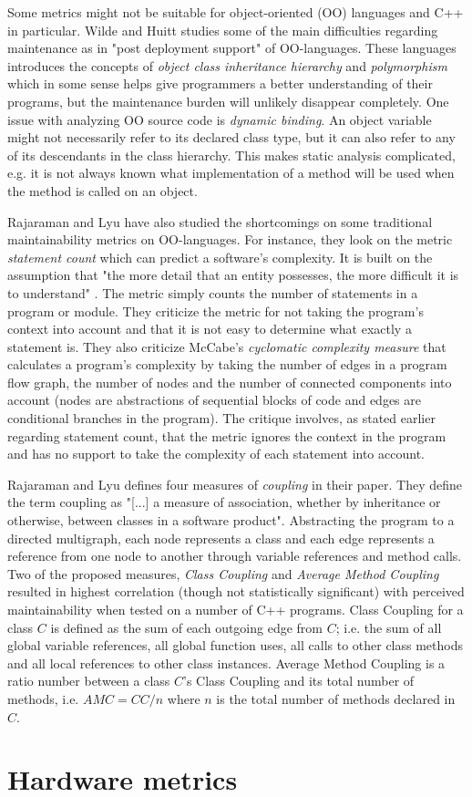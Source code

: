 Some metrics might not be suitable for object-oriented (OO) languages and C++
in particular. Wilde and Huitt \cite{wilde1991maintenance} studies some of the
main difficulties regarding maintenance as in "post deployment support" of
OO-languages. These languages introduces the concepts of \textit{object class
inheritance hierarchy} and \textit{polymorphism} which in some sense helps give
programmers a better understanding of their programs, but the maintenance
burden will unlikely disappear completely. One issue with analyzing OO source
code is \textit{dynamic binding}. An object variable might not necessarily
refer to its declared class type, but it can also refer to any of its
descendants in the class hierarchy. This makes static analysis complicated,
e.g. it is not always known what implementation of a method will be used when
the method is called on an object.

Rajaraman and Lyu \cite{rajaraman1992reliability} have also studied the
shortcomings on some traditional maintainability metrics on OO-languages. For
instance, they look on the metric \textit{statement count} which can predict a
software's complexity. It is built on the assumption that "the more detail that
an entity possesses, the more difficult it is to understand"
\cite{rajaraman1992reliability}. The metric simply counts the number of
statements in a program or module. They criticize the metric for not taking the
program's context into account and that it is not easy to determine what
exactly a statement is. They also criticize McCabe's
\cite{mccabe1976complexity} \textit{cyclomatic complexity measure} that
calculates a program's complexity by taking the number of edges in a program
flow graph, the number of nodes and the number of connected components into
account (nodes are abstractions of sequential blocks of code and edges are
conditional branches in the program). The critique involves, as stated earlier
regarding statement count, that the metric ignores the context in the program
and has no support to take the complexity of each statement into account.

Rajaraman and Lyu \cite{rajaraman1992reliability} defines four measures of
\textit{coupling} in their paper. They define the term coupling as "[...] a
measure of association, whether by inheritance or otherwise, between classes in
a software product". Abstracting the program to a directed multigraph, each
node represents a class and each edge represents a reference from one node to
another through variable references and method calls. Two of the proposed
measures, \textit{Class Coupling} and \textit{Average Method Coupling} resulted
in highest correlation (though not statistically significant) with perceived
maintainability when tested on a number of C++ programs. Class Coupling for a
class $C$ is defined as the sum of each outgoing edge from $C$; i.e. the sum of
all global variable references, all global function uses, all calls to other
class methods and all local references to other class instances. Average Method
Coupling is a ratio number between a class $C$'s Class Coupling and its total
number of methods, i.e. $AMC = CC / n$ where $n$ is the total number of methods
declared in $C$.

\section{Hardware metrics}
